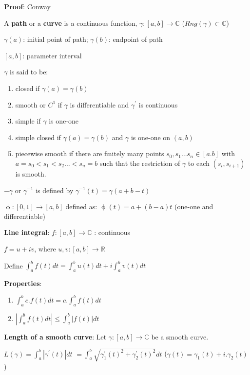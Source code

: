 \documentclass{article}
\begin{document}
\begin{flushleft}
\textbf{Proof}: Conway

\clearpage

A \textbf{path} or a \textbf{curve} is a continuous function, $\gamma:[a,b]\rightarrow \mathds{C}$ 
($Rng(\gamma)\subset \mathds{C}$) 

$\gamma(a)$: initial point of path; $\gamma(b)$: endpoint of path

$[a,b]$: parameter interval 

$\gamma$ is said to be:
\begin{enumerate}
    \item closed if $\gamma(a)=\gamma(b)$
    \item smooth or $C^1$ if $\gamma$ is differentiable and $\gamma^{'}$ is continuous
    \item simple if $\gamma$ is one-one
    \item simple closed if $\gamma(a)=\gamma(b)$ and $\gamma$ is one-one on $(a,b)$
    \item piecewise smooth if there are finitely many points $s_0,s_1 \dots s_n\in [a.b]$ with $a=s_0<s_1<s_2 \dots <s_n=b$ such that the restriction of $\gamma$ to each $(s_i,s_{i+1})$ is smooth.

\end{enumerate}

$-\gamma$ or $\gamma^{-1}$ is defined by $\gamma^{-1}(t)=\gamma(a+b-t)$

$\upphi:[0,1]\rightarrow [a,b]$ defined as: $\upphi(t)=a+(b-a)t$ (one-one and differentiable)

\textbf{Line integral}: $f:[a,b]\rightarrow \mathds{C}$ : continuous

$f=u+iv$, where $u,v:[a,b]\rightarrow \mathds{R}$

Define $\int_{a}^{b}f(t) dt= \int_{a}^{b}u(t) dt+ i \int_{a}^{b} v(t) dt$

\textbf{Properties}:

\begin{enumerate}
    \item $\int_{a}^{b} c.f(t) dt= c.\int_{a}^{b}f(t) dt$
    \item $| \int_{a}^{b}f(t) dt |\leq \int_{a}^{b}|f(t)| dt$
\end{enumerate}
\textbf{Length of a smooth curve}: Let $\gamma:[a,b]\rightarrow \mathds{C}$ be a smooth curve. 

$L(\gamma)= \int_{a}^{b} |\gamma^{'}(t)| dt$
$=\int_{a}^{b} \sqrt{\gamma_1^{'}(t)^2+\gamma_2^{'}(t)^2}  dt$  ($\gamma(t)=\gamma_1(t)+i.\gamma_2(t)$)


\end{flushleft}
\end{document}
